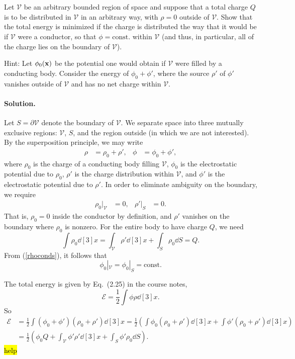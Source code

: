 \documentclass[11pt]{article}
\newcommand{\refeq}[1]{(\ref{#1})}
\newcommand{\beq}{\begin{equation*}}
\newcommand{\eeq}{\end{equation*}}
\newenvironment{statement}[1]
{
	\section{#1}
	\color{darkgray}
	\ignorespaces
}
{
}
\newenvironment{solution}
{
    \paragraph{Solution.}
    \ignorespaces
}
{
    \bigskip
}
\begin{document}



\newcommand{\cV}{\mathcal{V}}
\newcommand{\phio}{\phi_0}
\newcommand{\phiox}{\phio(\vx)}
\newcommand{\const}{\text{const.}}
\newcommand{\sig}{\sigma}
\newcommand{\alp}{\alpha}
\newcommand{\sigtv}{\sig(\tht, \vph)}

\newcommand{\sE}{\mathscr{E}}
\newcommand{\dcx}{\dd[3]{x}}
\newcommand{\rhoo}{\rho_0}
\newcommand{\dS}{\dd{S}}
\newcommand{\evS}{|_S}
\newcommand{\evV}{|_\cV}
\newcommand{\intS}{\int_S}
\newcommand{\intV}{\int_\cV}

\begin{statement}{}
	Let $\cV$ be an arbitrary bounded region of space and suppose that a total charge $Q$ is to be distributed in $\cV$ in an arbitrary way, with $\rho = 0$ outside of $\cV$.  Show that the total energy is minimized if the charge is distributed the way that it would be if $\cV$ were a conductor, so that $\phi = \const$ within $\cV$ (and thus, in particular, all of the charge lies on the boundary of $\cV$).
	
	Hint: Let $\phiox$ be the potential one would obtain if $\cV$ were filled by a conducting body.  Consider the energy of $\phio + \phi'$, where the source $\rho'$ of $\phi'$ vanishes outside of $\cV$ and has no net charge within $\cV$.
\end{statement}

\begin{solution}
	Let $S = \partial \cV$ denote the boundary of $\cV$.  We separate space into three mutually exclusive regions: $\cV$, $S$, and the region outside (in which we are not interested).  By the superposition principle, we may write
	\begin{align*}
		\rho &= \rhoo + \rho', &
		\phi &= \phio + \phi',
	\end{align*}
	where $\rhoo$ is the charge of a conducting body filling $\cV$, $\phio$ is the electrostatic potential due to $\rhoo$, $\rho'$ is the charge distribution within $\cV$, and $\phi'$ is the electrostatic potential due to $\rho'$.  In order to eliminate ambiguity on the boundary, we require
	\begin{align} \label{rhoconds}
		\rhoo\evV &= 0, &
		\rho'\evS &= 0.
	\end{align}
	That is, $\rhoo = 0$ inside the conductor by definition, and $\rho'$ vanishes on the boundary where $\rhoo$ is nonzero.  For the entire body to have charge $Q$, we need
	\beq
		\int \rhoo \dcx = \intV \rho' \dcx + \intS \rhoo \dS = Q.
	\eeq
	From \refeq{rhoconds}, it follows that
	\beq
		\phio\evV = \phio\evS = \const
	\eeq

	The total energy is given by Eq.~(2.25) in the course notes,
	\beq
		\sE = \frac{1}{2} \int \phi \rho \dcx.
	\eeq
	So
	\begin{align*}
		\sE &= \frac{1}{2} \int (\phio + \phi') (\rhoo + \rho') \dcx
		= \frac{1}{2} \left( \int \phio (\rhoo + \rho') \dcx + \int \phi' (\rhoo + \rho') \dcx \right) \\
		&= \frac{1}{2} \left( \phio Q + \intV \phi' \rho' \dcx + \intS \phi' \rhoo \dS \right).
	\end{align*}
	\hl{help}
\end{solution}
\end{document}
